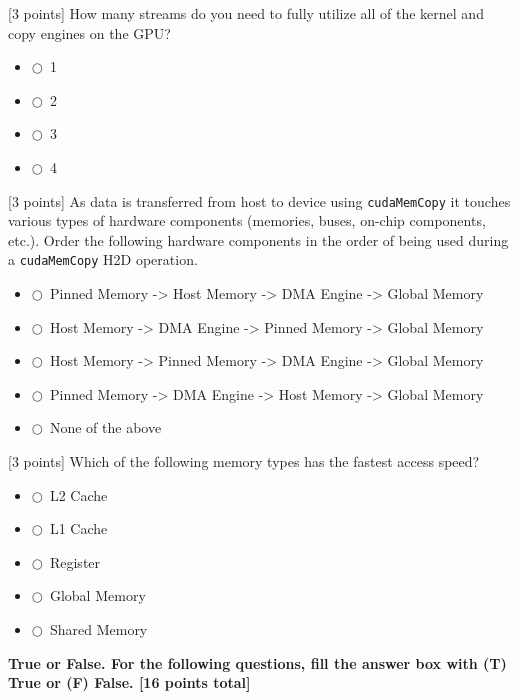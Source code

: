 \documentclass[12pt]{exam}
\newcommand{\mc}{$\bigcirc$\ }   %
\begin{document}
\begin{questions}
\question {}[3 points] How many streams do you need to fully utilize all of the kernel and copy
engines on the GPU?
\begin{itemize}[leftmargin=2.5em,itemsep=4pt,label={}]
  \item \mc 1
  \item \mc 2
  \item \mc 3
  \item \mc 4
\end{itemize}

\question {}[3 points] As data is transferred from host to device using \texttt{cudaMemCopy} it
touches various types of hardware components (memories, buses, on-chip components, etc.). Order
the following hardware components in the order of being used during a \texttt{cudaMemCopy} H2D
operation.
\begin{itemize}[leftmargin=2.5em,itemsep=4pt,label={}]
  \item \mc Pinned Memory -> Host Memory -> DMA Engine -> Global Memory
  \item \mc Host Memory -> DMA Engine -> Pinned Memory -> Global Memory
  \item \mc Host Memory -> Pinned Memory -> DMA Engine -> Global Memory
  \item \mc Pinned Memory -> DMA Engine -> Host Memory -> Global Memory
  \item \mc None of the above
\end{itemize}

\question {}[3 points] Which of the following memory types has the fastest access speed?
\begin{itemize}[leftmargin=2.5em,itemsep=4pt,label={}]
  \item \mc L2 Cache
  \item \mc L1 Cache
  \item \mc Register
  \item \mc Global Memory
  \item \mc Shared Memory
\end{itemize}

\newpage
\textbf{True or False. \textnormal{For the following questions, fill the answer box with (T)
True or (F) False.} [16 points total]}


\end{questions}
\end{document}

